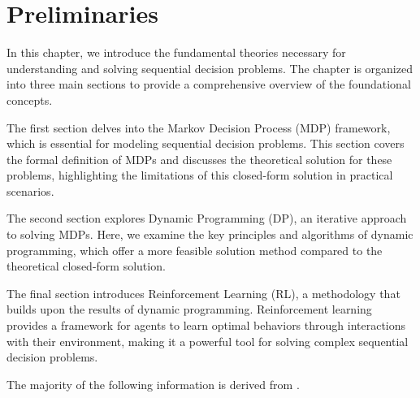 \chapter{Preliminaries}
\label{ch:Preliminaries}


In this chapter, we introduce the fundamental theories necessary for understanding and solving sequential decision problems.
The chapter is organized into three main sections to provide a comprehensive overview of the foundational concepts.

The first section delves into the Markov Decision Process (MDP) framework, which is essential for modeling sequential 
decision problems. This section covers the formal definition of MDPs and discusses the theoretical solution for 
these problems, highlighting the limitations of this closed-form solution in practical scenarios.

The second section explores Dynamic Programming (DP), an iterative approach to solving MDPs. Here, we examine the 
key principles and algorithms of dynamic programming, which offer a more feasible solution method compared 
to the theoretical closed-form solution.

The final section introduces Reinforcement Learning (RL), a methodology that builds upon the results of dynamic programming. 
Reinforcement learning provides a framework for agents to learn optimal behaviors through interactions with their environment,
making it a powerful tool for solving complex sequential decision problems.

The majority of the following information is derived from \cite{Sutton1998}.




% 
